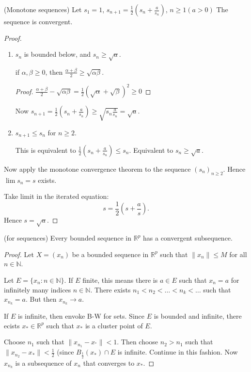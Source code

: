 
\begin{example}
	(Monotone sequences)
	Let $s_1 =1$, $s_{n+1}=\frac{1}{2} (s_n + \frac{a}{s_n})$, $n\ge 1 (a>0)$
	The sequence is convergent.
	\begin{proof}
		\begin{enumerate}
		\item $s_n$ is bounded below, and $s_n \ge \sqrt{a} $.
			\begin{lemma}
				if $\alpha,\beta\ge 0$, then $\frac{\alpha+\beta}{2}\ge \sqrt{\alpha\beta} $.
			\end{lemma}
			\begin{proof}
				$\frac{\alpha+\beta}{2}-\sqrt{\alpha\beta} = \frac{1}{2}\left( \sqrt{\alpha} +\sqrt{\beta}  \right) ^2 \ge 0$
			\end{proof}
			
			Now $s_{n+1}=\frac{1}{2}(s_n + \frac{a}{s_n})\ge \sqrt{s_n \frac{a}{s_n}}  = \sqrt{a} $.
		\item $s_{n+1}\le s_n$ for $n \ge 2$.

			This is equivalent to $\frac{1}{2}(s_n + \frac{a}{s_n}) \le s_n$. Equivalent to $s_n \ge \sqrt{a} $.
		\end{enumerate}
		Now apply the monotone convergence theorem to the sequence $\left( s_n \right) _{n\ge 2}$. Hence $\lim s_n = s$ exists.

		Take limit in the iterated equation:
		\[
			s = \frac{1}{2} (s + \frac{a}{s})
		.\] 
		Hence $s = \sqrt{a} $.
	\end{proof}
\end{example}

\begin{theorem}
	(for sequences)
	Every bounded sequence in $\mathbb{R}^p$ has a convergent subsequence.
\end{theorem}
\begin{proof}
	Let $X = (x_n)$ be a bounded sequence in $\mathbb{R}^p$ such that $\|x_n\|\le M$ for all $n \in \mathbb{N}$.

	Let $E = \{x_n: n \in \mathbb{N}\} $. If $E$ finite, this means there is $a \in E$ such that $x_n = a$ for infinitely many indices $n \in \mathbb{N}$. There exists $n_1 < n_2<\ldots<n_k < \ldots$ such that $x_{n_k} = a$. But then $x_{n_k}\to a$.

	If $E$ is infinite, then envoke B-W for sets. Since $E$ is bounded and infinite, there ecists $x_* \in \mathbb{R}^p$ such that $x_{*}$ is a cluster point of $E$.

	Choose $n_1$ such that $\|x_{n_1}-x_{^*}\|<1$. Then choose $n_2>n_1$ such that $\|x_{n_2}-x_{*}\|<\frac{1}{2}$ (since $B_{\frac{1}{2}}(x_{*}) \cap E$ is infinite. Continue in this fashion. Now $x_{n_k}$ is a subsequence of $x_n$ that converges to $x_{*}$.
\end{proof}

